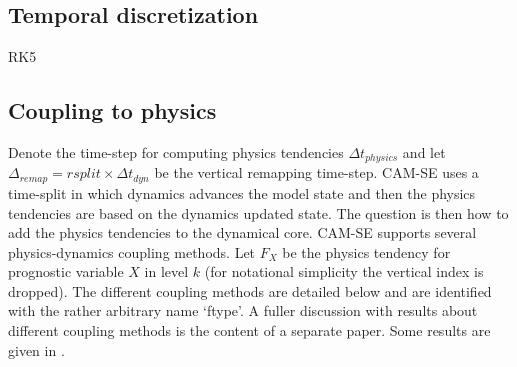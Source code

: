 \documentclass{agujournal}
\begin{document}

\subsection{Temporal discretization}
RK5
\subsection{Coupling to physics}
Denote the time-step for computing physics tendencies $\Delta t_{physics}$ and let $\Delta_{remap}=rsplit \times \Delta t_{dyn}$ be the vertical remapping time-step. CAM-SE uses a time-split {\color{red}{(CHECK if it is process or time split)}} in which dynamics advances the model state and then the physics tendencies are based on the dynamics updated state. The question is then how to add the physics tendencies to the dynamical core. CAM-SE supports several physics-dynamics coupling methods. Let $F_X$ be the physics tendency for prognostic variable $X$ in level $k$ (for notational simplicity the vertical index is dropped). The different coupling methods are detailed below and are identified with the rather arbitrary name `ftype'. A fuller discussion with results about different coupling methods is the content of a separate paper. Some results are given in {\color{red}{reference Jablo paper}}.
\end{document}
